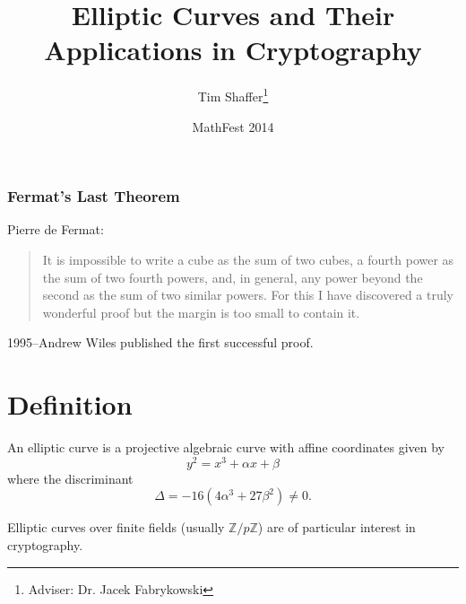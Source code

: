 \documentclass{beamer}
\title[Elliptic Curve Cryptography]{Elliptic Curves and
    Their Applications in Cryptography}
\author{Tim Shaffer\thanks{Adviser: Dr. Jacek Fabrykowski}}
\institute[YSU]{Youngstown State University}
\date{MathFest 2014}
\newcommand{\zmod}[1]{\ensuremath{\mathbb{Z}/#1\mathbb{Z}}}
\begin{document}
    \frenchspacing
    \frame{\maketitle}

    \begin{frame}
        \frametitle{Fermat's Last Theorem}
        Pierre de Fermat: %
        \begin{quote}
            It is impossible to write a cube as the sum of two cubes, a fourth
            power as the sum of two fourth powers, and, in general, any power
            beyond the second as the sum of two similar powers. For this I
            have discovered a truly wonderful proof but the margin is too
            small to contain it.
        \end{quote}
        \vfill
        1995--Andrew Wiles published the first successful proof.
    \end{frame}

    \section{Definition}
    \begin{frame}
        \begin{definition}
            An elliptic curve is a projective algebraic curve with
            affine coordinates given by \[y^2 = x^3 + \alpha x + \beta\]
            where the discriminant
            \[\Delta = -16(4\alpha^3 + 27\beta^2) \neq 0.\]
        \end{definition}
        \hyperlink{definitions}{}
        \vfill
        Elliptic curves over finite fields (usually \zmod{p}) are of
        particular interest in cryptography.
    \end{frame}
\end{document}
